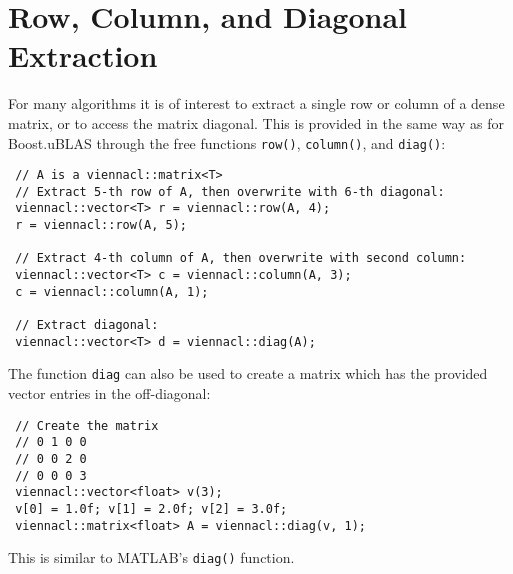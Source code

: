\section{Row, Column, and Diagonal Extraction}
For many algorithms it is of interest to extract a single row or column of a dense matrix, or to access the matrix diagonal.
This is provided in the same way as for Boost.uBLAS through the free functions \lstinline|row()|, \lstinline|column()|, and \lstinline|diag()|:
\begin{lstlisting}
 // A is a viennacl::matrix<T>
 // Extract 5-th row of A, then overwrite with 6-th diagonal:
 viennacl::vector<T> r = viennacl::row(A, 4);
 r = viennacl::row(A, 5);
 
 // Extract 4-th column of A, then overwrite with second column:
 viennacl::vector<T> c = viennacl::column(A, 3);
 c = viennacl::column(A, 1);

 // Extract diagonal:
 viennacl::vector<T> d = viennacl::diag(A);
\end{lstlisting}
The function \lstinline|diag| can also be used to create a matrix which has the provided vector entries in the off-diagonal:
\begin{lstlisting}
 // Create the matrix
 // 0 1 0 0
 // 0 0 2 0
 // 0 0 0 3
 viennacl::vector<float> v(3);
 v[0] = 1.0f; v[1] = 2.0f; v[2] = 3.0f;
 viennacl::matrix<float> A = viennacl::diag(v, 1);
\end{lstlisting}
This is similar to MATLAB's \lstinline|diag()| function.


